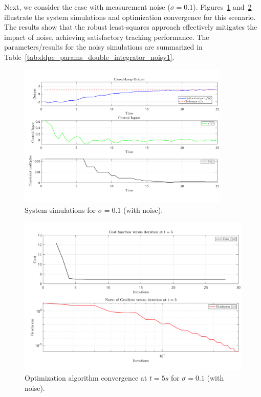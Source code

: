 Next, we consider the case with measurement noise ($\sigma = 0.1$). Figures~\ref{fig:ddpc_noisy1} and~\ref{fig:conv_noisy1} illustrate the system simulations and optimization convergence for this scenario. The results show that the robust least-squares approach effectively mitigates the impact of noise, achieving satisfactory tracking performance. The parameters/results for the noisy simulations are summarized in Table~\ref{tab:ddpc_params_double_integrator_noisy1}.
\begin{figure}[h!]
    \centering
    \includegraphics[width=0.9\textwidth]{figures/closed_loop_snr_0p1_gamma_4_rho_1.png}
    \caption{System simulations for $\sigma = 0.1$ (with noise).}
    \label{fig:ddpc_noisy1}
\end{figure}
\begin{figure}[h]
    \centering
    \includegraphics[width=\textwidth]{figures/cost_gradnorm_snr_0p1_gamma_4_rho_1.png}
    \caption{Optimization algorithm convergence at $t=5s$ for $\sigma = 0.1$ (with noise).}
    \label{fig:conv_noisy1}
\end{figure}


